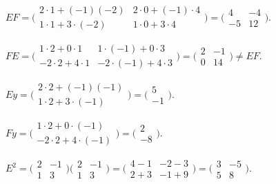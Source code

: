 \begin{solutions}
    \item $E F = \bigl(\begin{smallmatrix} 2 \cdot 1 + (-1)(-2) & 2 \cdot 0 + (-1) \cdot 4 \\ 1 \cdot 1 + 3 \cdot (-2) & 1 \cdot 0 + 3 \cdot 4 \end{smallmatrix}\bigr) = \bigl(\begin{smallmatrix} 4 & -4 \\ -5 & 12 \end{smallmatrix}\bigr)$.

    \item $F E = \bigl(\begin{smallmatrix} 1 \cdot 2 + 0 \cdot 1 & 1 \cdot (-1) + 0 \cdot 3 \\ -2 \cdot 2 + 4 \cdot 1 & -2 \cdot (-1) + 4 \cdot 3 \end{smallmatrix}\bigr) = \bigl(\begin{smallmatrix} 2 & -1 \\ 0 & 14 \end{smallmatrix}\bigr) \neq E F$.

    \item $E y = \bigl(\begin{smallmatrix} 2 \cdot 2 + (-1)(-1) \\ 1 \cdot 2 + 3 \cdot (-1) \end{smallmatrix}\bigr) = \bigl(\begin{smallmatrix} 5 \\ -1 \end{smallmatrix}\bigr)$.

    \item $F y = \bigl(\begin{smallmatrix} 1 \cdot 2 + 0 \cdot (-1) \\ -2 \cdot 2 + 4 \cdot (-1) \end{smallmatrix}\bigr) = \bigl(\begin{smallmatrix} 2 \\ -8 \end{smallmatrix}\bigr)$.

    \item $E^{2} = \bigl(\begin{smallmatrix} 2 & -1 \\ 1 & 3 \end{smallmatrix}\bigr)\bigl(\begin{smallmatrix} 2 & -1 \\ 1 & 3 \end{smallmatrix}\bigr) = \bigl(\begin{smallmatrix} 4 - 1 & -2 - 3 \\ 2 + 3 & -1 + 9 \end{smallmatrix}\bigr) = \bigl(\begin{smallmatrix} 3 & -5 \\ 5 & 8 \end{smallmatrix}\bigr)$.


\end{solutions}
